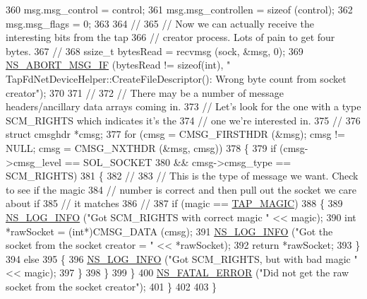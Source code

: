 \begin{DoxyCode}
360       msg.msg\_control = control;
361       msg.msg\_controllen = \textcolor{keyword}{sizeof} (control);
362       msg.msg\_flags = 0;
363 
364       \textcolor{comment}{//}
365       \textcolor{comment}{// Now we can actually receive the interesting bits from the tap}
366       \textcolor{comment}{// creator process.  Lots of pain to get four bytes.}
367       \textcolor{comment}{//}
368       ssize\_t bytesRead = recvmsg (sock, &msg, 0);
369       \hyperlink{group__fatal_ga6653324225bc139e46deea177614ceee}{NS\_ABORT\_MSG\_IF} (bytesRead != \textcolor{keyword}{sizeof}(\textcolor{keywordtype}{int}), \textcolor{stringliteral}{"
      TapFdNetDeviceHelper::CreateFileDescriptor(): Wrong byte count from socket creator"});
370 
371       \textcolor{comment}{//}
372       \textcolor{comment}{// There may be a number of message headers/ancillary data arrays coming in.}
373       \textcolor{comment}{// Let's look for the one with a type SCM\_RIGHTS which indicates it's the}
374       \textcolor{comment}{// one we're interested in.}
375       \textcolor{comment}{//}
376       \textcolor{keyword}{struct }cmsghdr *cmsg;
377       \textcolor{keywordflow}{for} (cmsg = CMSG\_FIRSTHDR (&msg); cmsg != NULL; cmsg = CMSG\_NXTHDR (&msg, cmsg))
378         \{
379           \textcolor{keywordflow}{if} (cmsg->cmsg\_level == SOL\_SOCKET
380               && cmsg->cmsg\_type == SCM\_RIGHTS)
381             \{
382               \textcolor{comment}{//}
383               \textcolor{comment}{// This is the type of message we want.  Check to see if the magic}
384               \textcolor{comment}{// number is correct and then pull out the socket we care about if}
385               \textcolor{comment}{// it matches}
386               \textcolor{comment}{//}
387               \textcolor{keywordflow}{if} (magic == \hyperlink{tap-fd-net-device-helper_8cc_af9ac95d538205da6013d79a63fee2bd7}{TAP\_MAGIC})
388                 \{
389                   \hyperlink{group__logging_gafbd73ee2cf9f26b319f49086d8e860fb}{NS\_LOG\_INFO} (\textcolor{stringliteral}{"Got SCM\_RIGHTS with correct magic "} << magic);
390                   \textcolor{keywordtype}{int} *rawSocket = (\textcolor{keywordtype}{int}*)CMSG\_DATA (cmsg);
391                   \hyperlink{group__logging_gafbd73ee2cf9f26b319f49086d8e860fb}{NS\_LOG\_INFO} (\textcolor{stringliteral}{"Got the socket from the socket creator = "} << *rawSocket);
392                   \textcolor{keywordflow}{return} *rawSocket;
393                 \}
394               \textcolor{keywordflow}{else}
395                 \{
396                   \hyperlink{group__logging_gafbd73ee2cf9f26b319f49086d8e860fb}{NS\_LOG\_INFO} (\textcolor{stringliteral}{"Got SCM\_RIGHTS, but with bad magic "} << magic);
397                 \}
398             \}
399         \}
400       \hyperlink{group__fatal_ga5131d5e3f75d7d4cbfd706ac456fdc85}{NS\_FATAL\_ERROR} (\textcolor{stringliteral}{"Did not get the raw socket from the socket creator"});
401     \}
402 
403 \}
\end{DoxyCode}



